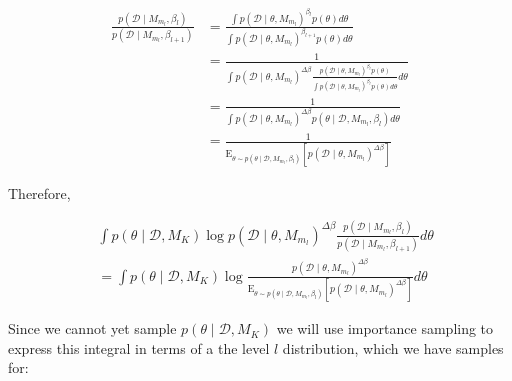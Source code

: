 \documentclass[1p]{article}
\begin{document}
\begin{equation}
\begin{split}
\frac{p \left (\mathcal{D} \mid M_{m_l}, \beta_{l} \right )}{p \left (\mathcal{D} \mid M_{m_l}, \beta_{l+1} \right )} &= \frac{\int p \left (\mathcal{D} \mid \theta, M_{m_l} \right )^{\beta_l} p \left ( \theta \right ) d\theta}{\int p \left (\mathcal{D} \mid \theta, M_{m_l} \right )^{\beta_{l+1}} p \left ( \theta \right ) d\theta}\\
&= \frac{1}{\int p \left (\mathcal{D} \mid \theta, M_{m_l} \right )^{\Delta \beta} \frac{p \left (\mathcal{D} \mid \theta, M_{m_l} \right )^{\beta_l} p \left ( \theta \right )}{\int p \left (\mathcal{D} \mid \theta, M_{m_l} \right )^{\beta_l} p \left ( \theta \right ) d\theta}  d\theta}\\
&= \frac{1}{\int p \left (\mathcal{D} \mid \theta, M_{m_l} \right )^{\Delta \beta} p \left (\theta \mid \mathcal{D}, M_{m_l}, \beta_l \right )  d\theta}\\
&= \frac{1}{\text{E}_{\theta \sim p \left (\theta \mid \mathcal{D}, M_{m_l}, \beta_l \right )} \left [ p \left (\mathcal{D} \mid \theta, M_{m_l} \right )^{\Delta \beta} \right ]}
\end{split}
\end{equation}

\noindent Therefore,

\begin{equation}
\begin{split}
&\int p \left (\theta \mid \mathcal{D}, M_K \right )\log p \left (\mathcal{D} \mid \theta, M_{m_l} \right )^{\Delta \beta} \frac{p \left (\mathcal{D} \mid M_{m_l}, \beta_{l} \right )}{p \left (\mathcal{D} \mid M_{m_l}, \beta_{l+1} \right )} d\theta\\
&= \int p \left (\theta \mid \mathcal{D}, M_K \right )\log \frac{p \left (\mathcal{D} \mid \theta, M_{m_l} \right )^{\Delta \beta}}{\text{E}_{\theta \sim p \left (\theta \mid \mathcal{D}, M_{m_l}, \beta_l \right )} \left [ p \left (\mathcal{D} \mid \theta, M_{m_l} \right )^{\Delta \beta} \right ]} d\theta
\end{split}
\end{equation}

Since we cannot yet sample $p \left (\theta \mid \mathcal{D}, M_K \right )$ we will use importance sampling to express this integral in terms of a the level $l$ distribution, which we have samples for:
\end{document}
